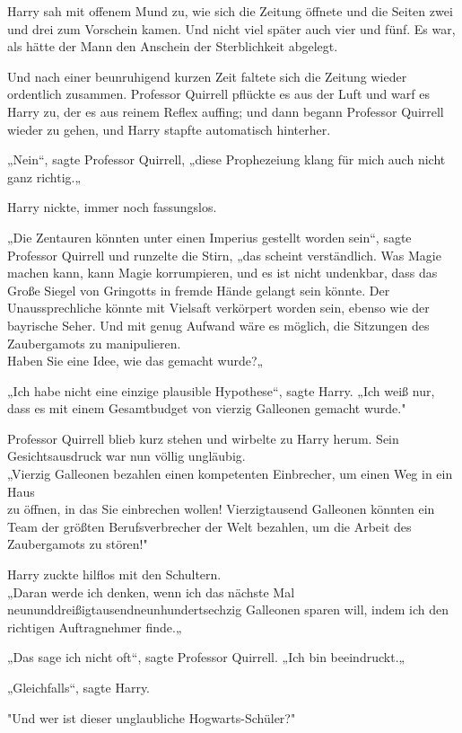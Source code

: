 {Harry sah mit offenem Mund zu, wie sich die Zeitung öffnete und die Seiten zwei und drei zum Vorschein kamen. Und nicht viel später auch vier und fünf. Es war, als hätte der Mann den Anschein der Sterblichkeit abgelegt.

Und nach einer beunruhigend kurzen Zeit faltete sich die Zeitung wieder ordentlich zusammen. Professor Quirrell pflückte es aus der Luft und warf es Harry zu, der es aus reinem Reflex auffing; und dann begann Professor Quirrell wieder zu gehen, und Harry stapfte automatisch hinterher.

„Nein“, sagte Professor Quirrell, „diese Prophezeiung klang für mich auch nicht ganz richtig.„

Harry nickte, immer noch fassungslos.

„Die Zentauren könnten unter einen Imperius gestellt worden sein“, sagte Professor Quirrell und runzelte die Stirn, „das scheint verständlich. Was Magie machen kann, kann Magie korrumpieren, und es ist nicht undenkbar, dass das Große Siegel von Gringotts in fremde Hände gelangt sein könnte. Der Unaussprechliche könnte mit Vielsaft verkörpert worden sein, ebenso wie der bayrische Seher. Und mit genug Aufwand wäre es möglich, die Sitzungen des Zaubergamots zu manipulieren.\\ Haben Sie eine Idee, wie das gemacht wurde?„

„Ich habe nicht eine einzige plausible Hypothese“, sagte Harry. „Ich weiß nur, dass es mit einem Gesamtbudget von vierzig Galleonen gemacht wurde."

Professor Quirrell blieb kurz stehen und wirbelte zu Harry herum. Sein Gesichtsausdruck war nun völlig ungläubig.\\ „Vierzig Galleonen bezahlen einen kompetenten Einbrecher, um einen Weg in ein Haus\\ zu öffnen, in das Sie einbrechen wollen! Vierzigtausend Galleonen könnten ein Team der größten Berufsverbrecher der Welt bezahlen, um die Arbeit des Zaubergamots zu stören!"

Harry zuckte hilflos mit den Schultern.\\ „Daran werde ich denken, wenn ich das nächste Mal neununddreißigtausendneunhundertsechzig Galleonen sparen will, indem ich den richtigen Auftragnehmer finde.„

„Das sage ich nicht oft“, sagte Professor Quirrell. „Ich bin beeindruckt.„

„Gleichfalls“, sagte Harry.

"Und wer ist dieser unglaubliche Hogwarts-Schüler?"

}
